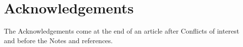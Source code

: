 \documentclass[twoside,twocolumn,9pt]{article}
\renewcommand{\refname}{Notes and references}
\begin{document}
\section*{Acknowledgements}
The Acknowledgements come at the end of an article after Conflicts of interest and before the Notes and references.



\balance


\end{document}
